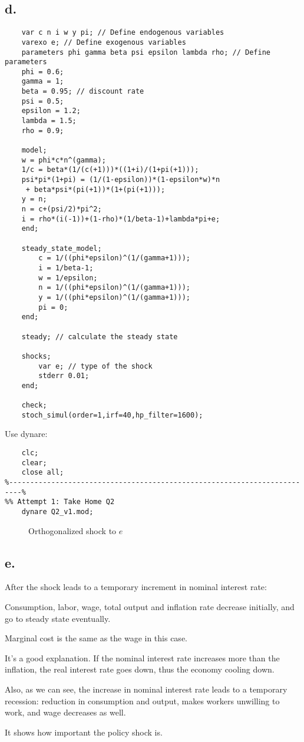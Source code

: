 \documentclass{article}
\begin{document}
\subsection*{d.}

\begin{lstlisting}
    var c n i w y pi; // Define endogenous variables
    varexo e; // Define exogenous variables
    parameters phi gamma beta psi epsilon lambda rho; // Define parameters
    phi = 0.6; 
    gamma = 1;
    beta = 0.95; // discount rate
    psi = 0.5; 
    epsilon = 1.2;
    lambda = 1.5;
    rho = 0.9; 
    
    model;
    w = phi*c*n^(gamma); 
    1/c = beta*(1/(c(+1)))*((1+i)/(1+pi(+1)));
    psi*pi*(1+pi) = (1/(1-epsilon))*(1-epsilon*w)*n
     + beta*psi*(pi(+1))*(1+(pi(+1)));
    y = n;
    n = c+(psi/2)*pi^2;
    i = rho*(i(-1))+(1-rho)*(1/beta-1)+lambda*pi+e;
    end;
    
    steady_state_model;
        c = 1/((phi*epsilon)^(1/(gamma+1)));
        i = 1/beta-1;
        w = 1/epsilon;
        n = 1/((phi*epsilon)^(1/(gamma+1)));
        y = 1/((phi*epsilon)^(1/(gamma+1)));
        pi = 0;
    end;
    
    steady; // calculate the steady state
    
    shocks;
        var e; // type of the shock
        stderr 0.01; 
    end;
    
    check;
    stoch_simul(order=1,irf=40,hp_filter=1600);
\end{lstlisting}

Use dynare:
\begin{lstlisting}
    clc;
    clear;
    close all;
%-------------------------------------------------------------------------%
%% Attempt 1: Take Home Q2 
    dynare Q2_v1.mod;
\end{lstlisting}

\begin{figure}[H]
    \centering
    
    \caption{Orthogonalized shock to $e$}
    \label{fig:figure3}
\end{figure}

\subsection*{e.}

After the shock leads to a temporary increment in nominal interest rate:

Consumption, labor, wage, total output and inflation rate decrease initially, and go to steady state eventually.

Marginal cost is the same as the wage in this case.

It's a good explanation. If the nominal interest rate increases more than the inflation, the real interest rate goes down, thus the economy cooling down.

Also, as we can see, the increase in nominal interest rate leads to a temporary recession: reduction in consumption and output, makes workers unwilling to work, and wage decreases as well.

It shows how important the policy shock is.
\end{document}
